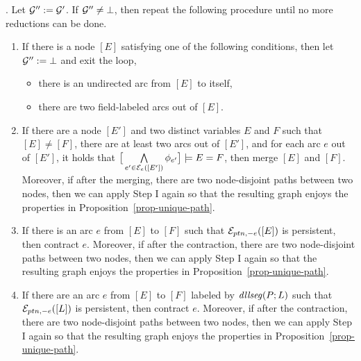 \documentclass{llncs}
\begin{document}
\smallskip

. Let $\mathcal{G}'' :=\mathcal{G}'$. If $\mathcal{G}'' \neq \bot$, then repeat the following procedure until no more reductions can be done.
\begin{enumerate}
\item If there is a node $[E]$ satisfying one of the following conditions, then let $\mathcal{G}'':=\bot$ and exit the loop,
\begin{itemize}
\item there is an undirected arc from $[E]$ to itself,
%
\item there are two field-labeled arcs out of $[E]$.
\end{itemize}
%
\item If there are a node $[E']$ and two distinct variables $E$ and $F$ such that $[E] \neq [F]$,  there are at least two arcs out of $[E']$, and for each arc $e$ out of $[E']$, it holds that $\big [\bigwedge \limits_{e' \in \mathcal{E}_e([E'])} \phi_{e'} \big] \models E=F$, then merge $[E]$ and $[F]$.
Moreover, if after the merging, there are two node-disjoint paths between two nodes,  then we can apply Step I again so that the resulting graph enjoys the properties in Proposition~\ref{prop-unique-path}.
%
\item If there is an arc $e$ from $[E]$ to $[F]$ such that $\mathcal{E}_{ptn,-e}([E])$ is persistent, then contract $e$. Moreover, if after the contraction, there are two node-disjoint paths between two nodes,  then we can apply Step I again so that the resulting graph enjoys the properties in Proposition~\ref{prop-unique-path}.
%
\item If there are an arc $e$ from $[E]$ to $[F]$ labeled by $\mathit{dllseg}(P;L)$ such that $\mathcal{E}_{ptn,-e}([L])$ is persistent, then contract $e$. Moreover, if after the contraction, there are two node-disjoint paths between two nodes,  then we can apply Step I again so that the resulting graph enjoys the properties in Proposition~\ref{prop-unique-path}.
%
\end{enumerate}
\end{document}
